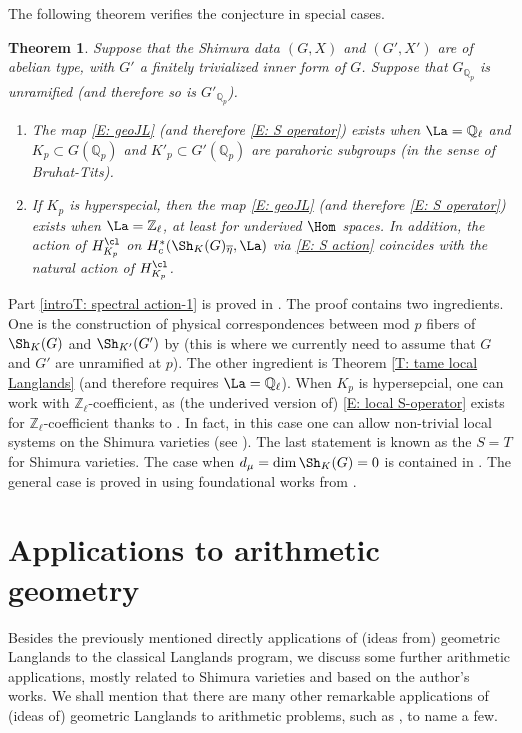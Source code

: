 \documentclass[11pt]{amsart}
\newtheorem{thm}{Theorem}[subsection]
\theoremstyle{definition}
\theoremstyle{definition}
\theoremstyle{definition}
\numberwithin{equation}{section}
\newcommand{\bQ}{{\mathbb Q}}
\newcommand{\bZ}{{\mathbb Z}}
\begin{document}
The following theorem verifies the conjecture in special cases.
\begin{thm}
\label{introT: spectral action}
Suppose that the Shimura data $(G,X)$ and $(G',X')$ are of abelian type, with $G'$ a finitely trivialized inner form of $G$. Suppose that $G_{\bQ_p}$ is unramified (and therefore so is $G'_{\bQ_p}$).
\begin{enumerate}
\item\label{introT: spectral action-1} The map \eqref{E: geoJL} (and therefore \eqref{E: S operator}) exists when $\La=\bQ_\ell$ and  $K_p\subset G(\bQ_p)$ and $K'_p\subset G'(\bQ_p)$ are parahoric subgroups (in the sense of Bruhat-Tits).
\item\label{introT: spectral action-2} If $K_p$ is hyperspecial, then the map \eqref{E: geoJL} (and therefore \eqref{E: S operator}) exists when $\La=\bZ_\ell$, at least for underived $\Hom$ spaces. In addition, the
action of $H_{K_p}^{\cl}$ on $H_c^*(\Sh_{K}(G)_{\overline\eta},\La)$ via \eqref{E: S action} coincides with the natural action of $H_{K_p}^{\cl}$. 
\end{enumerate}
\end{thm}
Part \eqref{introT: spectral action-1} is proved in \cite{Xiao-Zhu-Cycle, Hemo-Zhu-Unipotent}. The proof contains two ingredients. One is the construction of physical correspondences between mod $p$ fibers of $\Sh_K(G)$ and $\Sh_{K'}(G')$ by \cite{Xiao-Zhu-Cycle} (this is where we currently need to assume that $G$ and $G'$ are unramified at $p$). The other ingredient is Theorem \ref{T: tame local Langlands} (and therefore requires $\La=\bQ_\ell$). When $K_p$ is hypersepcial, one can work with $\bZ_\ell$-coefficient, as (the underived version of) \eqref{E: local S-operator} exists for $\bZ_\ell$-coefficient thanks to \cite{Yu-Jacquet-Langlands-Higher-Weights}. In fact, in this case one can allow non-trivial local systems on the Shimura varieties (see  \cite{Yu-Jacquet-Langlands-Higher-Weights}).
The last statement is known as the $S=T$ for Shimura varieties. The case when $d_{\mu}=\dim\Sh_K(G)=0$ is contained in \cite{Xiao-Zhu-Cycle}. The general case is proved in \cite{Wu-S=T, Zhu-S=T} using foundational works from \cite{Scholze-Berkeley, Fargues-Scholze-Geometrization}. 

\section{Applications to arithmetic geometry}\label{Application}
Besides the previously mentioned directly applications of (ideas from) geometric Langlands to the classical Langlands program, we discuss some further arithmetic applications, mostly related to Shimura varieties and based on the author's works.
We shall mention that there are many other remarkable applications of (ideas of) geometric Langlands to arithmetic problems, such as \cite{Gaitsgory-deJong, HNY-Kloosterman, Yun-motive-exceptional-group, Xu-Zhu-Bessel, LLLM}, to name a few. 
\end{document}
